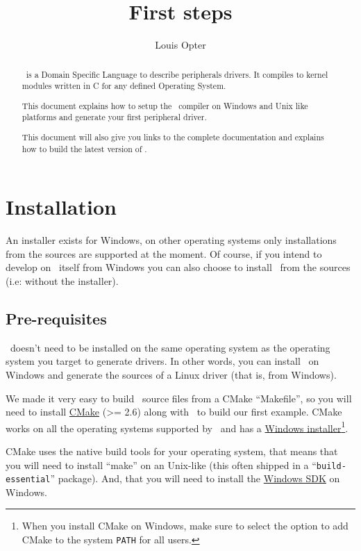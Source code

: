 \documentclass[american]{rtxarticle}
\title{First steps}
\author{Louis Opter}
\begin{document}
\maketitle

\begin{abstract}
\rtx\ is a Domain Specific Language to describe peripherals drivers. It
compiles to kernel modules written in C for any defined Operating System.

This document explains how to setup the \rtx\ compiler on Windows and Unix like
platforms and generate your first peripheral driver.

This document will also give you links to the complete documentation and
explains how to build the latest version of \rtx.
\end{abstract}

\tableofcontents

\pagebreak

\section{Installation}

An installer exists for Windows, on other operating systems only installations
from the sources are supported at the moment. Of course, if you intend to
develop on \rtx\ itself from Windows you can also choose to install \rtx\ from
the sources (i.e: without the installer).

\subsection{Pre-requisites}

\rtx\ doesn't need to be installed on the same operating system as the
operating system you target to generate drivers. In other words, you can
install \rtx\ on Windows and generate the sources of a Linux driver (that is,
from Windows).

We made it very easy to build \rtx\ source files from a CMake ``Makefile'', so
you will need to install \href{http://www.cmake.org/}{CMake} (>= 2.6) along with
\rtx\ to build our first example. CMake works on all the operating systems
supported by \rtx\ and has a \href{http://www.cmake.org/cmake/resources/software.html}{Windows
installer}\footnote{When you install CMake on Windows, make sure to select the
option to add CMake to the system \texttt{PATH} for all users.}.

CMake uses the native build tools for your operating system, that means that you
will need to install ``make'' on an Unix-like (this often shipped in a
``\texttt{build-essential}'' package). And, that you will need to install the
\href{http://www.microsoft.com/download/en/details.aspx?id=8279}{Windows SDK} on
Windows.
\end{document}
